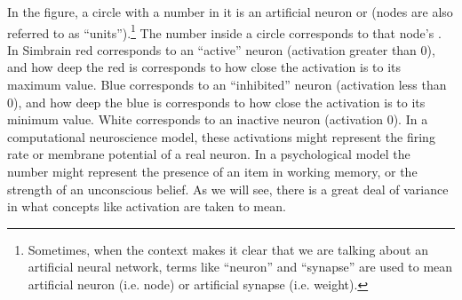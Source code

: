 In the figure, a circle with a number in it is an artificial neuron or  (nodes are also referred to as ``units'').\footnote{Sometimes, when the context makes it clear that we are talking about an artificial neural network, terms like ``neuron'' and ``synapse'' are used to mean artificial neuron (i.e. node) or artificial synapse (i.e. weight).}  The number inside a circle corresponds to that node's . In Simbrain red corresponds to an ``active'' neuron (activation  greater than 0), and how deep the red is corresponds to how close the activation is to its maximum value. Blue corresponds to an ``inhibited'' neuron (activation less than 0), and how deep the blue is corresponds to how close the activation is to its minimum value. White corresponds to an inactive neuron (activation 0). In a computational neuroscience model, these activations might represent the firing rate or membrane potential of a real neuron. In a psychological model the number might represent the presence of an item in working memory, or the strength of an unconscious belief. As we will see, there is a great deal of variance in what concepts like activation are taken to mean.
